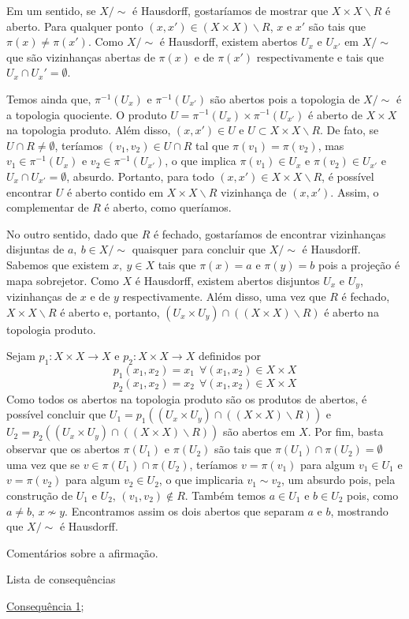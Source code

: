 \begin{dem}
    Em um sentido, se $X/\sim$ é Hausdorff, gostaríamos de mostrar que $X\times X\backslash R$ é aberto. Para qualquer ponto $(x,x')\in (X\times X)\backslash R$, $x$ e $x'$ são tais que $\pi(x)\neq \pi(x')$. Como $X/\sim$ é Hausdorff, existem abertos $U_x$ e $U_{x'}$ em $X/\sim$ que são vizinhanças abertas de $\pi(x)$ e de $\pi(x')$ respectivamente e tais que $U_x\cap U_x' = \emptyset$.

    Temos ainda que, $\pi^{-1}(U_x)$ e $\pi^{-1}(U_{x'})$ são abertos pois a topologia de $X/\sim$ é a topologia quociente. O produto $U=\pi^{-1}(U_x)\times \pi^{-1}(U_{x'})$ é aberto de $X\times X$ na topologia produto. Além disso, $(x,x')\in U$ e $U\subset X\times X\backslash R$. De fato, se $U\cap R\neq \emptyset$, teríamos $(v_1,v_2)\in U\cap R$ tal que $\pi(v_1)=\pi(v_2)$, mas $v_1 \in \pi^{-1}(U_x)$ e $v_2\in \pi^{-1}(U_{x'})$, o que implica $\pi(v_1)\in U_x$ e $\pi(v_2)\in U_{x'}$ e $U_x\cap U_{x'}=\emptyset$, absurdo. Portanto, para todo $(x,x')\in X\times X\backslash R$, é possível encontrar $U$ é aberto contido em $X\times X\backslash R$ vizinhança de $(x,x')$. Assim, o complementar de $R$ é aberto, como queríamos.\newline

    No outro sentido, dado que $R$ é fechado, gostaríamos de encontrar vizinhanças disjuntas de $a,~b\in X/\sim$ quaisquer para concluir que $X/\sim$ é Hausdorff. Sabemos que existem $x,~y\in X$ tais que $\pi(x)=a$ e $\pi(y)=b$ pois a projeção é mapa sobrejetor. Como $X$ é Hausdorff, existem abertos disjuntos $U_x$ e $U_y$, vizinhanças de $x$ e de $y$ respectivamente. Além disso, uma vez que $R$ é fechado, $X\times X\backslash R$ é aberto e, portanto, $(U_x\times U_y)\cap((X\times X)\backslash R)$ é aberto na topologia produto.

    Sejam $p_1:X\times X\rightarrow X$ e $p_2:X\times X\rightarrow X$ definidos por $$p_1(x_1,x_2)=x_1 ~~\forall (x_1,x_2)\in X\times X$$ $$p_2(x_1,x_2)=x_2 ~~\forall (x_1,x_2)\in X\times X$$ Como todos os abertos na topologia produto são os produtos de abertos, é possível concluir que $U_1=p_1((U_x\times U_y)\cap((X\times X)\backslash R))$ e $U_2=p_2((U_x\times U_y)\cap((X\times X)\backslash R))$ são abertos em $X$. Por fim, basta observar que os abertos $\pi(U_1)$ e $\pi(U_2)$ são tais que $\pi(U_1)\cap \pi(U_2)=\emptyset$ uma vez que se $v\in \pi(U_1)\cap\pi(U_2)$, teríamos $v=\pi(v_1)$ para algum $v_1\in U_1$ e $v=\pi(v_2)$ para algum $v_2\in U_2$, o que implicaria $v_1\sim v_2$, um absurdo pois, pela construção de $U_1$ e $U_2$, $(v_1,v_2)\not\in R$.  Também temos $a\in U_1$ e $b\in U_2$ pois, como $a\neq b$, $x\not\sim y$. Encontramos assim os dois abertos que separam $a$ e $b$, mostrando que $X/\sim$ é Hausdorff.

\end{dem}
Comentários sobre a afirmação.

\begin{titlemize}{Lista de consequências}
	\item \hyperref[consequencia1]{Consequência 1};\\ %
\end{titlemize}

